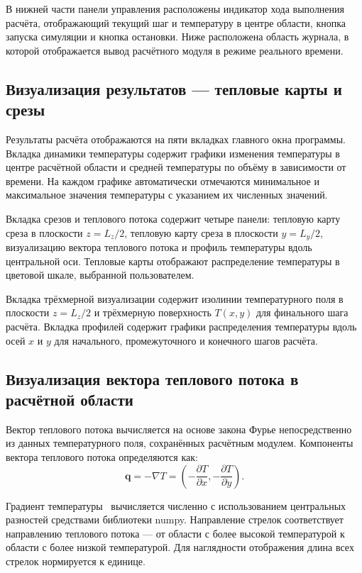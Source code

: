 В нижней части панели управления расположены индикатор хода 
выполнения расчёта, отображающий текущий шаг и температуру 
в центре области, кнопка запуска симуляции и кнопка остановки. 
Ниже расположена область журнала, в которой отображается вывод 
расчётного модуля в режиме реального времени.

\subsection{Визуализация результатов --- тепловые карты и срезы}

Результаты расчёта отображаются на пяти вкладках главного окна 
программы. Вкладка динамики температуры содержит графики изменения 
температуры в центре расчётной области и средней температуры по 
объёму в зависимости от времени. На каждом графике автоматически 
отмечаются минимальное и максимальное значения температуры с 
указанием их численных значений.

Вкладка срезов и теплового потока содержит четыре панели: тепловую 
карту среза в плоскости $z = L_z/2$, тепловую карту среза в 
плоскости $y = L_y/2$, визуализацию вектора теплового потока и 
профиль температуры вдоль центральной оси. Тепловые карты 
отображают распределение температуры в цветовой шкале, 
выбранной пользователем.

Вкладка трёхмерной визуализации содержит изолинии температурного 
поля в плоскости $z = L_z/2$ и трёхмерную поверхность 
$T(x, y)$ для финального шага расчёта. Вкладка профилей 
содержит графики распределения температуры вдоль осей $x$ и $y$ 
для начального, промежуточного и конечного шагов расчёта.

\subsection{Визуализация вектора теплового потока в расчётной области
}

Вектор теплового потока вычисляется на основе закона Фурье 
непосредственно из данных температурного поля, сохранённых 
расчётным модулем. Компоненты вектора теплового потока 
определяются как:
\begin{equation}
    \mathbf{q} = -\nabla T = 
    \left( -\frac{\partial T}{\partial x}, 
           -\frac{\partial T}{\partial y} \right).
\end{equation}

Градиент температуры~\cite{махоньков2013влияние} вычисляется численно с использованием 
центральных разностей средствами библиотеки numpy. Направление 
стрелок соответствует направлению теплового потока --- от 
области с более высокой температурой к области с более 
низкой температурой. Для наглядности отображения длина 
всех стрелок нормируется к единице.

